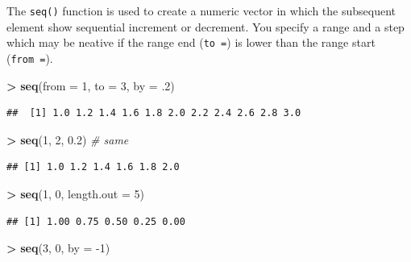 \documentclass[]{book}
\newenvironment{Shaded}{\begin{snugshade}}{\end{snugshade}}
\newcommand{\CommentTok}[1]{\textcolor[rgb]{0.56,0.35,0.01}{\textit{#1}}}
\newcommand{\DataTypeTok}[1]{\textcolor[rgb]{0.13,0.29,0.53}{#1}}
\newcommand{\DecValTok}[1]{\textcolor[rgb]{0.00,0.00,0.81}{#1}}
\newcommand{\FloatTok}[1]{\textcolor[rgb]{0.00,0.00,0.81}{#1}}
\newcommand{\KeywordTok}[1]{\textcolor[rgb]{0.13,0.29,0.53}{\textbf{#1}}}
\newcommand{\NormalTok}[1]{#1}
\newcommand{\OperatorTok}[1]{\textcolor[rgb]{0.81,0.36,0.00}{\textbf{#1}}}
\newcommand{\StringTok}[1]{\textcolor[rgb]{0.31,0.60,0.02}{#1}}
\begin{document}
The \texttt{seq()} function is used to create a numeric vector in which the subsequent element show sequential increment or decrement. You specify a range and a step which may be neative if the range end (\texttt{to\ =}) is lower than the range start (\texttt{from\ =}).

\begin{Shaded}
\begin{Highlighting}[]
\OperatorTok{>}\StringTok{ }\KeywordTok{seq}\NormalTok{(}\DataTypeTok{from =} \DecValTok{1}\NormalTok{, }\DataTypeTok{to =} \DecValTok{3}\NormalTok{, }\DataTypeTok{by =} \FloatTok{.2}\NormalTok{)}
\end{Highlighting}
\end{Shaded}

\begin{verbatim}
##  [1] 1.0 1.2 1.4 1.6 1.8 2.0 2.2 2.4 2.6 2.8 3.0
\end{verbatim}

\begin{Shaded}
\begin{Highlighting}[]
\OperatorTok{>}\StringTok{ }\KeywordTok{seq}\NormalTok{(}\DecValTok{1}\NormalTok{, }\DecValTok{2}\NormalTok{, }\FloatTok{0.2}\NormalTok{) }\CommentTok{# same}
\end{Highlighting}
\end{Shaded}

\begin{verbatim}
## [1] 1.0 1.2 1.4 1.6 1.8 2.0
\end{verbatim}

\begin{Shaded}
\begin{Highlighting}[]
\OperatorTok{>}\StringTok{ }\KeywordTok{seq}\NormalTok{(}\DecValTok{1}\NormalTok{, }\DecValTok{0}\NormalTok{, }\DataTypeTok{length.out =} \DecValTok{5}\NormalTok{)}
\end{Highlighting}
\end{Shaded}

\begin{verbatim}
## [1] 1.00 0.75 0.50 0.25 0.00
\end{verbatim}

\begin{Shaded}
\begin{Highlighting}[]
\OperatorTok{>}\StringTok{ }\KeywordTok{seq}\NormalTok{(}\DecValTok{3}\NormalTok{, }\DecValTok{0}\NormalTok{, }\DataTypeTok{by =} \DecValTok{-1}\NormalTok{)}
\end{Highlighting}
\end{Shaded}
\end{document}
